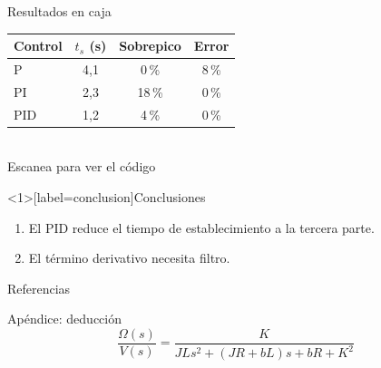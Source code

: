 \documentclass[aspectratio=169]{beamer}
\begin{document}
\begin{frame}{Resultados en caja}
  \begin{tcolorbox}[colback=green!5, colframe=green!40!black, title=Mediciones]
    \begin{tabular}{lccc}
      Control & $t_s$ (s) & Sobrepico & Error \\ \hline
      P & 4,1 & 0\,\% & 8\,\% \\
      PI & 2,3 & 18\,\% & 0\,\% \\
      PID & 1,2 & 4\,\% & 0\,\% \\
    \end{tabular}
  \end{tcolorbox}
  \begin{center}
    \\
    \tiny Escanea para ver el código
  \end{center}
\end{frame}

\begin{frame}<1>[label=conclusion]{Conclusiones}
  \begin{enumerate}
    \item<1-> El PID reduce el tiempo de establecimiento a la tercera parte.
    \item<2-> El término derivativo necesita filtro.
  \end{enumerate}
\end{frame}

\begin{frame}{Referencias}
  \printbibliography
\end{frame}

\appendix
\begin{frame}{Apéndice: deducción}
  \[ \frac{\Omega(s)}{V(s)} = \frac{K}{JLs^2 + (JR+bL)s + bR + K^2} \]
\end{frame}
\end{document}
